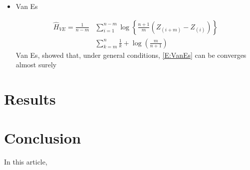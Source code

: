 \documentclass[conference]{IEEEtran}
\begin{document}
\begin{itemize}
	\item Van Es 

\begin{align*}
	\widehat{H}_{VE}=\frac{1}{n-m}&\sum_{i=1}^{n-m}\log\left\{\frac{n+1}{m}\left(Z_{(i+m)}-Z_{(i)}\right)\right\}\\
	&\sum_{k=m}^n\frac{1}{k}+\log\left(\frac{m}{n+1}\right)
\end{align*}
Van Es, showed that, under general conditions, \ref{E:VanEs} can be converges almost surely 
\end{itemize}



\section{Results}

\section{Conclusion}\label{sec_09}

In this article, 


%


\end{document}

